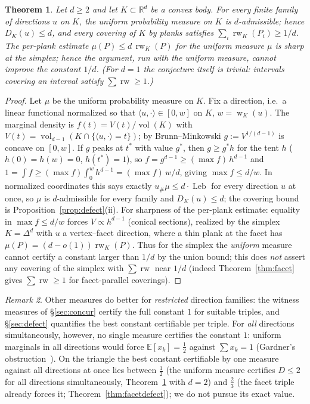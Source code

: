 \documentclass{aims}
\numberwithin{equation}{section}
\theoremstyle{plain}
\newtheorem{theorem}{Theorem}[section]
\theoremstyle{definition}
\theoremstyle{remark}
\newtheorem{remark}[theorem]{Remark}
\newcommand{\rw}{\operatorname{rw}}
\newcommand{\Leb}{\operatorname{Leb}}
\newcommand{\R}{\mathbb{R}}
\DeclareMathOperator{\wid}{w}
\DeclareMathOperator{\vol}{vol}
\begin{document}
\begin{theorem}\label{thm:oned}
Let $d\ge2$ and let $K\subset\R^d$ be a convex body. For \emph{every} finite
family of directions $u$ on $K$, the uniform probability measure on $K$ is
$d$-admissible; hence $D_K(u)\le d$, and every covering of $K$ by planks
satisfies $\sum_i\rw_K(P_i)\ge 1/d$. The per-plank estimate
$\mu(P)\le d\,\rw_K(P)$ for the uniform measure $\mu$ is sharp at the simplex;
hence the argument, run with the uniform measure, cannot improve the constant
$1/d$. (For $d=1$ the conjecture itself is trivial: intervals covering an
interval satisfy $\sum\rw\ge1$.)
\end{theorem}
\begin{proof}
Let $\mu$ be the uniform probability measure on $K$. Fix a direction, i.e.\ a
linear functional normalized so that $\langle u,\cdot\rangle\in[0,w]$ on $K$,
$w=\wid_K(u)$. The marginal density is
$f(t)=V(t)/\vol(K)$ with $V(t)=\vol_{d-1}(K\cap\{\langle u,\cdot\rangle=t\})$; by
Brunn--Minkowski $g:=V^{1/(d-1)}$ is concave on $[0,w]$. If $g$ peaks at $t^\ast$
with value $g^\ast$, then $g\ge g^\ast h$ for the tent $h$ ($h(0)=h(w)=0$,
$h(t^\ast)=1$), so $f=g^{d-1}\ge(\max f)\,h^{d-1}$ and
$1=\int f\ge(\max f)\int_0^w h^{d-1}=(\max f)\,w/d$, giving $\max f\le d/w$. In
normalized coordinates this says exactly $u_{\#}\mu\le d\cdot\Leb$ for every
direction $u$ at once, so $\mu$ is $d$-admissible for every family and
$D_K(u)\le d$; the covering bound is Proposition~\ref{prop:defect}(ii). For
sharpness of the per-plank estimate: equality in $\max f\le d/w$ forces
$V\propto h^{d-1}$ (conical sections),
realized by the simplex $K=\Delta^d$ with $u$ a vertex--facet direction, where a
thin plank at the facet has $\mu(P)=(d-o(1))\rw_K(P)$. Thus for the simplex the
\emph{uniform} measure cannot certify a constant larger than $1/d$ by the union
bound; this does \emph{not} assert any covering of the simplex with
$\sum\rw$ near $1/d$ (indeed Theorem~\ref{thm:facet} gives $\sum\rw\ge1$ for
facet-parallel coverings).
\end{proof}
\begin{remark}\label{rem:oneall}
Other measures do better for \emph{restricted} direction families: the witness
measures of \S\ref{sec:concur} certify the full constant $1$ for suitable triples,
and \S\ref{sec:defect} quantifies the best constant certifiable per triple. For
\emph{all} directions simultaneously, however, no single measure certifies the
constant $1$: uniform marginals in all directions would force
$\mathbb E[x_k]=\tfrac12$ against $\sum x_k=1$ (Gardner's
obstruction~\cite{Gardner88}). On the triangle the best constant certifiable by
one measure against all directions at once lies between $\tfrac12$ (the uniform
measure certifies $D\le2$ for all directions simultaneously,
Theorem~\ref{thm:oned} with $d=2$) and $\tfrac23$ (the facet triple
already forces it; Theorem~\ref{thm:facetdefect}); we do not pursue its exact
value.
\end{remark}
\end{document}

